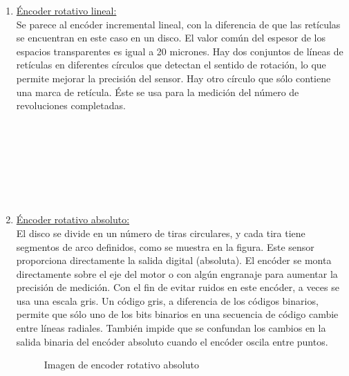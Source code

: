 \begin{enumerate}
\begin{enumerate}
\begin{enumerate}
\begin{enumerate}
				\item \underline{Éncoder rotativo lineal:} \\
				Se parece al encóder incremental lineal, con la diferencia
				de que las retículas se encuentran en este caso en un disco. El valor común del espesor de los espacios transparentes es igual a 20 micrones. Hay dos conjuntos de líneas de retículas en diferentes círculos que detectan el sentido de rotación, lo que permite mejorar la precisión del sensor. Hay otro círculo que sólo contiene una marca de retícula. Éste se usa para la medición del número
				de revoluciones completadas.\cite{saha2010robotics}
				\\
		\begin{figure}[h]
	\centering
	\hfill
\end{figure}				
\\
\\
\\
\\
\\
\\

				\item \underline{Éncoder rotativo absoluto:} \\
				El disco se divide en un número de tiras circulares, y cada tira tiene segmentos de arco definidos, como se muestra en la figura. Este sensor proporciona directamente la salida digital (absoluta). El encóder se monta directamente sobre el eje del motor o con algún engranaje para aumentar la precisión de medición. Con el fin de evitar ruidos en este encóder, a veces se usa una escala gris. Un código gris, a diferencia de los códigos binarios, permite que sólo uno de los bits binarios en una secuencia de código cambie entre líneas radiales. También impide que se confundan los cambios en la salida binaria del encóder absoluto cuando el encóder oscila entre puntos. \cite {saha2010robotics}
				\\
				\begin{figure}[h]
					\centering
					\hfill
					\caption{Imagen de encoder rotativo absoluto}
					\label{fig:mascotas}
				\end{figure}
			\end{enumerate}
		

\end{enumerate}
\end{enumerate}
\end{enumerate}
